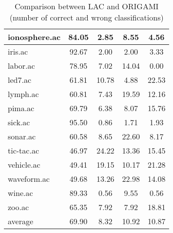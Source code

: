 \begin{table}[htbp]
\begin{tabular}{|l|c|c|c|c|}
		\hline
		ionosphere.ac   & 84.05         & 2.85               & 8.55                     & 4.56                          \\
		\hline
		iris.ac         & 92.67         & 2.00               & 2.00                     & 3.33                          \\
		\hline
		labor.ac        & 78.95         & 7.02               & 14.04                    & 0.00                          \\
		\hline
		led7.ac         & 61.81         & 10.78              & 4.88                     & 22.53                         \\
		\hline
		lymph.ac        & 60.81         & 7.43               & 19.59                    & 12.16                         \\
		\hline
		pima.ac         & 69.79         & 6.38               & 8.07                     & 15.76                         \\
		\hline
		sick.ac         & 95.50         & 0.86               & 1.71                     & 1.93                          \\
		\hline
		sonar.ac        & 60.58         & 8.65               & 22.60                    & 8.17                          \\
		\hline
		tic-tac.ac      & 46.97         & 24.22              & 13.36                    & 15.45                         \\
		\hline
		vehicle.ac      & 49.41         & 19.15              & 10.17                    & 21.28                         \\
		\hline
		waveform.ac     & 49.68         & 13.26              & 22.98                    & 14.08                         \\
		\hline
		wine.ac         & 89.33         & 0.56               & 9.55                     & 0.56                          \\
		\hline
		zoo.ac          & 65.35         & 7.92               & 7.92                     & 18.81                         \\
		\hline
		average         & 69.90         & 8.32               & 10.92                    & 10.87                         \\
		\hline
		\end{tabular}
	\caption{Comparison between LAC and ORIGAMI (number of correct and wrong classifications)}
	\label{tab:comparison_lac_origami}
\end{table}